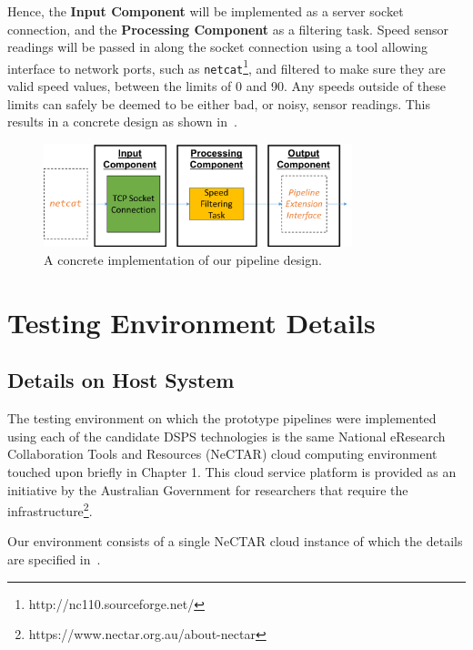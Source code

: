 Hence, the \textbf{Input Component} will be implemented as a server socket connection,
and the \textbf{Processing Component} as a filtering task. Speed sensor readings will be passed in along the socket connection
using a tool allowing interface to network ports, such as \texttt{netcat}\footnote{http://nc110.sourceforge.net/}, and filtered to make sure they are valid
speed values, between the limits of 0 and 90. Any speeds
outside of these limits can safely be deemed to be either bad, or noisy, sensor readings. This results in a concrete design as shown
in~.

\begin{figure}[ht]
  \centering
  \includegraphics[width=0.8\textwidth]{includes/figures/fig_pipeline_concrete}
  \caption{A concrete implementation of our pipeline design.}
  \label{fig:pipeline_concrete}
\end{figure}



\section{Testing Environment Details} %
\label{sub:testing_environment_details}

\subsection{Details on Host System} %
\label{ssub:host_system}

The testing environment on which the prototype pipelines were implemented using each of the candidate DSPS technologies
is the same National eResearch Collaboration Tools and Resources (NeCTAR) cloud computing environment touched upon
briefly in Chapter 1. This cloud service platform is provided as an initiative by the Australian Government for researchers
that require the infrastructure\footnote{https://www.nectar.org.au/about-nectar}.

Our environment consists of a single NeCTAR cloud instance of which the details are specified in~.

